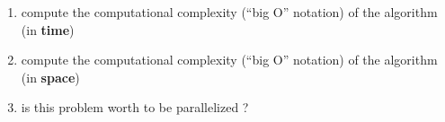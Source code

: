 \documentclass[11pt,a4paper]{article}
\begin{document}


\begin{exercise}
  $~$ %
\begin{enumerate}[label=(\alph*)]

	\item compute the computational complexity (``big O'' notation) of the algorithm (in {\bf time})


	\item compute the computational complexity (``big O'' notation) of the algorithm (in {\bf space})


	\item is this problem worth to be parallelized ?

\end{enumerate}

\end{exercise}
\end{document}
